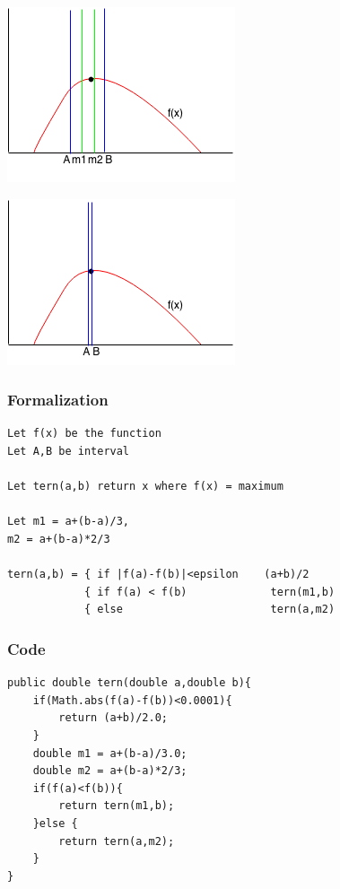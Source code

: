 \documentclass[11pt,oneside]{book}
\makeatletter
\def\maxwidth#1{\ifdim\Gin@nat@width>#1 #1\else\Gin@nat@width\fi}
\makeatother
\begin{document}
\vspace{5px}\includegraphics[width=\maxwidth{\textwidth}]{ternarysearch6.png}

\vspace{5px}\includegraphics[width=\maxwidth{\textwidth}]{ternarysearch7.png}

\subsubsection{Formalization}

\begin{lstlisting}
Let f(x) be the function 
Let A,B be interval

Let tern(a,b) return x where f(x) = maximum

Let m1 = a+(b-a)/3,
m2 = a+(b-a)*2/3

tern(a,b) = { if |f(a)-f(b)|<epsilon    (a+b)/2 
            { if f(a) < f(b)             tern(m1,b)
            { else                       tern(a,m2)
\end{lstlisting}

\subsubsection{Code}

\begin{lstlisting}
public double tern(double a,double b){
    if(Math.abs(f(a)-f(b))<0.0001){
        return (a+b)/2.0;
    }
    double m1 = a+(b-a)/3.0;
    double m2 = a+(b-a)*2/3;
    if(f(a)<f(b)){
        return tern(m1,b);
    }else {
        return tern(a,m2);
    }
}
\end{lstlisting}
\end{document}
